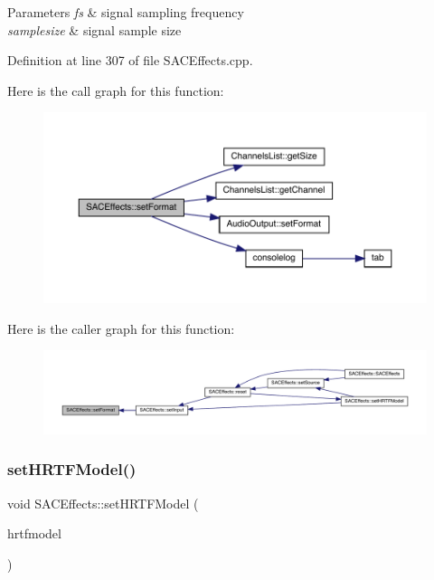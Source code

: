 \begin{DoxyParams}{Parameters}
{\em fs} & signal sampling frequency \\
\hline
{\em samplesize} & signal sample size \\
\hline
\end{DoxyParams}


Definition at line 307 of file S\+A\+C\+Effects.\+cpp.

Here is the call graph for this function\+:
\nopagebreak
\begin{figure}[H]
\begin{center}
\leavevmode
\includegraphics[width=350pt]{class_s_a_c_effects_a3d06db323bc9a3a1bbfe810f2a30d10f_cgraph}
\end{center}
\end{figure}
Here is the caller graph for this function\+:
\nopagebreak
\begin{figure}[H]
\begin{center}
\leavevmode
\includegraphics[width=350pt]{class_s_a_c_effects_a3d06db323bc9a3a1bbfe810f2a30d10f_icgraph}
\end{center}
\end{figure}
\mbox{\label{class_s_a_c_effects_a9af83c6a63fcdf10e4bd849fa3c5973c}} 
\subsubsection{\texorpdfstring{set\+H\+R\+T\+F\+Model()}{setHRTFModel()}}
{\footnotesize\ttfamily void S\+A\+C\+Effects\+::set\+H\+R\+T\+F\+Model (\begin{DoxyParamCaption}\item[{\hyperlink{struct_h_r_t_f_model_ae01efd7375e498a14624bbeebb93fa82}{H\+R\+T\+F\+Model\+::hrtfmodel}}]{hrtfmodel }\end{DoxyParamCaption})}


